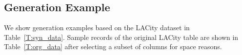 \begin{table}[t]
\begin{tabular}{|c|c|c|c|c|c|c|}
\hline
\end{tabular}
\end{table}

\subsection{Generation Example}
We show generation examples based on the LACity dataset in Table~\ref{T:syn_data}. Sample records of the original LACity table are shown in Table~\ref{T:org_data} after selecting a subset of columns for space reasons.



